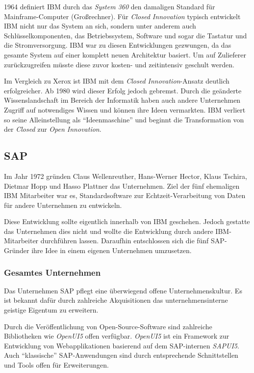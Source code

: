 1964 definiert IBM durch das \textit{System 360} den damaligen Standard für Mainframe-Computer (Großrechner).
Für \textit{Closed Innovation} typisch entwickelt IBM nicht nur das System an sich,
sondern unter anderem auch Schlüsselkomponenten, das Betriebssystem, Software und sogar die Tastatur und die Stromversorgung.
IBM war zu diesen Entwicklungen gezwungen,
da das gesamte System auf einer komplett neuen Architektur basiert.
Um auf Zulieferer zurückzugreifen müsste diese zuvor kosten- und zeitintensiv geschult werden.

Im Vergleich zu Xerox ist IBM mit dem \textit{Closed Innovation}-Ansatz deutlich erfolgreicher.
Ab 1980 wird dieser Erfolg jedoch gebremst.
Durch die geänderte Wissenslandschaft im Bereich der Informatik haben auch andere Unternehmen
Zugriff auf notwendiges Wissen und können ihre Ideen vermarkten.
IBM verliert so seine Alleinstellung als \enquote{Ideenmaschine}
und beginnt die Transformation von der \textit{Closed} zur \textit{Open Innovation}.


\subsection{SAP}\label{sec:beispiele-sap}
Im Jahr 1972 gründen Claus Wellenreuther, Hans-Werner Hector, Klaus Tschira, Dietmar Hopp und Hasso Plattner das Unternehmen.
Ziel der fünf ehemaligen IBM Mitarbeiter war es,
Standardsoftware zur Echtzeit-\linebreak{}Verarbeitung von Daten für andere Unternehmen zu entwickeln.

Diese Entwicklung sollte eigentlich innerhalb von IBM geschehen.
Jedoch gestatte das Unternehmen dies nicht und wollte die Entwicklung durch andere IBM-Mitarbeiter durchführen lassen.
Daraufhin entschlossen sich die fünf SAP-Gründer ihre Idee in einem eigenen Unternehmen umzusetzen. \cite{SAPCompa72:online}

\subsubsection{Gesamtes Unternehmen}\label{sec:beispiele-sap-gesamt}
Das Unternehmen SAP pflegt eine überwiegend offene Unternehmenskultur.
Es ist bekannt dafür durch zahlreiche Akquisitionen das unternehmensinterne geistige Eigentum zu erweitern.

Durch die Veröffentlichung von Open-Source-Software sind zahlreiche Bibliotheken wie \textit{OpenUI5} offen verfügbar.
\textit{OpenUI5} ist ein Framework zur Entwicklung von Webapplikationen basierend auf dem SAP-internen \textit{SAPUI5}.
Auch \enquote{klassische} SAP-Anwendungen sind durch entsprechende Schnittstellen
und Tools offen für Erweiterungen.

